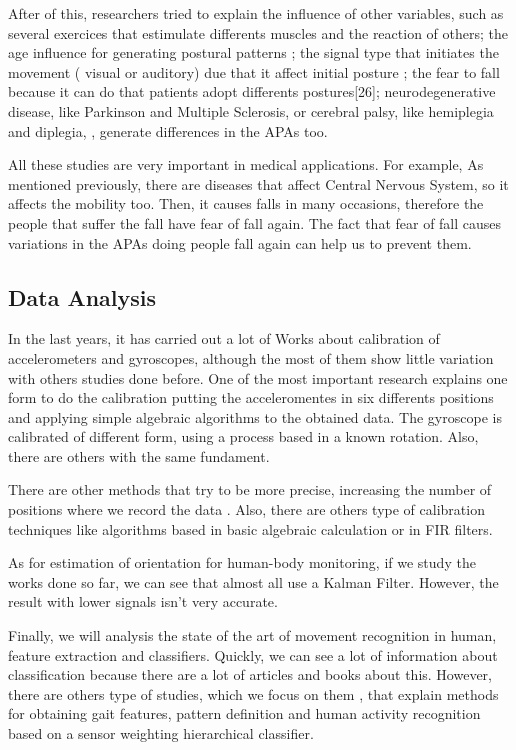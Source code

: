After of this, researchers tried to explain the influence of other variables, such as several exercices that estimulate differents muscles and the reaction of others\cite{Gay2011}; the age influence for generating postural patterns \cite{Bleuse2006} \cite{Estelle2008}; the signal type that initiates the movement ( visual or auditory) due that it affect initial posture \cite{Mcllroy1993}\cite{Antonia2009}\cite{Vicent1999}\cite{Tard2013}; the fear to fall because it can do that patients adopt differents postures[26]; neurodegenerative disease, like Parkinson and Multiple Sclerosis\cite{Mancini2009}\cite{Jebb2008}\cite{Chris2005}\cite{Hall2013}, or cerebral palsy, like hemiplegia and diplegia, \cite{Hall2013}, generate differences in the APAs too.

All these studies are very important in medical applications. For example, As mentioned previously, there are diseases that affect Central Nervous System, so it affects  the mobility too. Then, it causes falls in many occasions, therefore  the people that suffer the fall have fear of fall again. The fact that fear of fall causes variations in the APAs doing people  fall again can help us to prevent them.

\subsection{Data Analysis}

In the last years, it has carried out a lot of Works about  calibration of accelerometers and gyroscopes, although the most of them show little variation with others studies done before. One of the most important research  \cite{Kian2011}explains one form to do the calibration putting the acceleromentes in six differents positions and applying  simple algebraic algorithms to the obtained data. The gyroscope is calibrated of different form, using a process based in a known rotation. Also, there are others with the same fundament.

There are other methods that try to be more precise, increasing the number of positions where we record the data \cite{Camps2009}. Also, there are others type of calibration techniques like algorithms based in basic algebraic calculation or in FIR filters. \cite{A.Olivares2013}

As for estimation of orientation for human-body monitoring, if we study the works done so far, we can see that almost all  use a Kalman Filter. However, the result with lower signals isn’t very accurate.\cite{A.Olivares2013}

Finally, we will analysis the state of the art of movement recognition in human, feature extraction and classifiers. Quickly, we can see a lot of information about classification because there are a lot of articles and books about this. However, there are others type of studies, which we focus on  them \cite{FrenkelToledo} \cite{Jeon}\cite{Banos2012}, that explain methods for obtaining gait features, pattern definition and human activity recognition based on a sensor weighting hierarchical classifier. 
